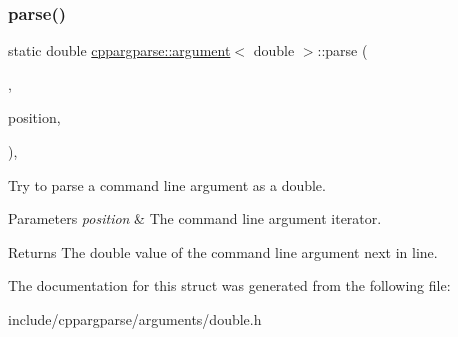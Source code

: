 \subsubsection{\texorpdfstring{parse()}{parse()}}
{\footnotesize\ttfamily static double \hyperlink{structcppargparse_1_1argument}{cppargparse\+::argument}$<$ double $>$\+::parse (\begin{DoxyParamCaption}\item[{const types\+::\+Command\+Line\+\_\+t \&}]{,  }\item[{const types\+::\+Command\+Line\+Position\+\_\+t \&}]{position,  }\item[{const types\+::\+Command\+Line\+Arguments\+\_\+t \&}]{ }\end{DoxyParamCaption})\hspace{0.3cm}{\ttfamily [inline]}, {\ttfamily [static]}}



Try to parse a command line argument as a double. 


\begin{DoxyParams}{Parameters}
{\em position} & The command line argument iterator.\\
\hline
\end{DoxyParams}
\begin{DoxyReturn}{Returns}
The double value of the command line argument next in line. 
\end{DoxyReturn}


The documentation for this struct was generated from the following file\+:\begin{DoxyCompactItemize}
\item 
include/cppargparse/arguments/double.\+h\end{DoxyCompactItemize}
